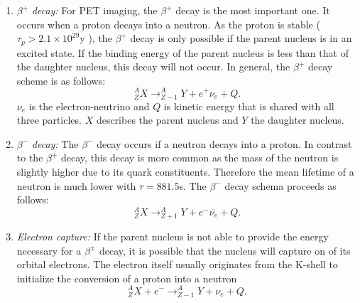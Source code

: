 \begin{enumerate}
\item $\beta^+$ \textit{decay: }For PET imaging, the $\beta^+$ decay is the most important one. It occurs when a proton decays into a neutron. As the proton is stable ($\tau_p > 2.1 \times 10^{29}$y \cite{PDG}), the $\beta^+$ decay is only possible if the parent nucleus is in an excited state. If the binding energy of the parent nucleus is less than that of the daughter nucleus, this decay will not occur. In general, the $\beta^+$ decay scheme is as follows:
\begin{equation}
^A_ZX\rightarrow ^A_{Z-1}Y + e^+ \nu_e + Q.
\end{equation}
$\nu_e$ is the electron-neutrino and $Q$ is kinetic energy that is shared with all three particles. $X$ describes the parent nucleus and $Y$ the daughter nucleus.
\item $\beta^-$ \textit{decay: }The $\beta^-$ decay occurs if a neutron decays into a proton. In contrast to the $\beta^+$ decay, this decay is more common as the mass of the neutron is slightly higher due to its quark constituents. Therefore the mean lifetime of a neutron is much lower with $\tau = 881.5$s\cite{PDG}. The $\beta^-$ decay schema proceeds as follows:
\begin{equation}
^A_ZX\rightarrow ^A_{Z+1}Y + e^- \overline{\nu_e} + Q.
\end{equation}
\item \textit{Electron capture: }If the parent nucleus is not able to provide the energy necessary for a $\beta^\pm$ decay, it is possible that the nucleus will capture on of its orbital electrons. The electron itself usually originates from the K-shell to initialize the conversion of a proton into a neutron
\begin{equation}
^A_ZX + e^-\rightarrow ^A_{Z-1}Y + \nu_e + Q.
\end{equation}
\end{enumerate}
